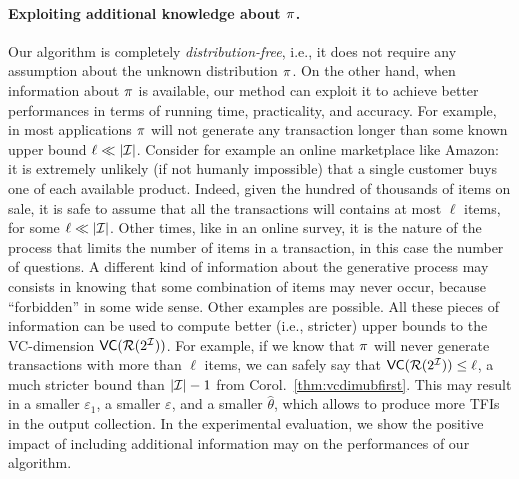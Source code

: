 \paragraph{Exploiting additional knowledge about $\pi$.} Our algorithm is
completely \emph{distribution-free}, i.e., it does not require any assumption
about the unknown distribution $\pi$. On the other hand, when information
about $\pi$ is available, our method can exploit it to achieve better
performances in terms of running time, practicality, and accuracy.  For example,
in most applications $\pi$ will not generate any transaction longer than some
known upper bound $\ell\ll|{\cal I}|$. Consider for example an online marketplace
like Amazon: it is extremely unlikely (if not humanly impossible) that a single
customer buys one of each available product. Indeed, given the hundred of
thousands of items on sale, it is safe to assume that all the transactions will
contains at most $\ell$ items, for some $\ell\ll|{\cal I}|$. Other times, like in an
online survey, it is the nature of the process that limits the number of items
in a transaction, in this case the number of questions. A different kind of
information about the generative process may consists in knowing that some
combination of items may never occur, because ``forbidden'' in some wide sense.
Other examples are possible. All these pieces of information can be used to
compute better (i.e., stricter) upper bounds to the VC-dimension
$\mathsf{VC}(\mathcal{R}(2^{\cal I}))$. For example, if we know that $\pi$ will never generate
transactions with more than $\ell$ items, we can safely say that
$\mathsf{VC}(\mathcal{R}(2^{\cal I}))\le \ell$, a much stricter bound than $|{\cal I}|-1$ from
Corol.~\ref{thm:vcdimubfirst}. This may result in a smaller $\varepsilon_1$, a
smaller $\varepsilon$, and a smaller $\hat\theta$, which allows to produce more
TFIs in the output collection. In the experimental evaluation, we show the
positive impact of including additional information may on the performances of
our algorithm.
